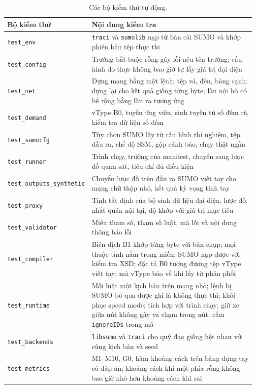 \documentclass[../DoAn.tex]{subfiles}
\begin{document}
\begin{table}[H]
\centering
\small
\caption{Các bộ kiểm thử tự động.}
\label{table:4.5}
\begin{tabular}{|p{3.6cm}|p{9.4cm}|}
\hline
\textbf{Bộ kiểm thử} & \textbf{Nội dung kiểm tra} \\ \hline
\texttt{test\_env} & \texttt{traci} và \texttt{sumolib} nạp từ bản cài SUMO và khớp phiên bản tệp thực thi \\ \hline
\texttt{test\_config} & Trường bắt buộc rỗng gây lỗi nêu tên trường; cấu hình đo thực không bao giờ tự lấy giá trị đại diện \\ \hline
\texttt{test\_net} & Dựng mạng bằng một lệnh; tệp vá, đèn, bảng cạnh; dựng lại cho kết quả giống từng byte; làn nội bộ có bề rộng bằng làn ra tương ứng \\ \hline
\texttt{test\_demand} & vType B0, tuyến ứng viên, sinh tuyến từ số đếm rẽ, kiểm tra dữ liệu số đếm \\ \hline
\texttt{test\_sumocfg} & Tùy chọn SUMO lấy từ cấu hình thí nghiệm, tệp đầu ra, chế độ SSM, gộp cảnh báo, chạy thật ngắn \\ \hline
\texttt{test\_runner} & Trình chạy, trường của manifest, chuyển sang lược đồ quan sát, tiêu chí đủ điều kiện \\ \hline
\texttt{test\_outputs\_\allowbreak synthetic} & Chuyển lược đồ trên đầu ra SUMO viết tay cho mạng chữ thập nhỏ, kết quả kỳ vọng tính tay \\ \hline
\texttt{test\_proxy} & Tính tất định của bộ sinh dữ liệu đại diện, lược đồ, nhất quán nội tại, độ khớp với giá trị mục tiêu \\ \hline
\texttt{test\_validator} & Miền tham số, tham số luật, mã lỗi và nội dung thông báo lỗi \\ \hline
\texttt{test\_compiler} & Biên dịch B1 khớp từng byte với bản chụp; mọi thuộc tính nằm trong miền; SUMO nạp được với kiểm tra XSD; đặc tả B0 tương đương tệp vType viết tay; mã vType báo về khi lấy từ phân phối \\ \hline
\texttt{test\_runtime} & Mỗi luật một kịch bản trên mạng nhỏ; lệnh bị SUMO bỏ qua được ghi là không thực thi; khôi phục speed mode; tích hợp với trình chạy; giữ xe giữa nút không gây va chạm trong nút; cấm \texttt{ignoreIDs} trong mã \\ \hline
\texttt{test\_backends} & \texttt{libsumo} và \texttt{traci} cho quỹ đạo giống hệt nhau với cùng kịch bản và seed \\ \hline
\texttt{test\_metrics} & M1--M10, G0, hàm khoảng cách trên bảng dựng tay có đáp án; khoảng cách khi một phía rỗng không bao giờ nhỏ hơn khoảng cách khi sai \\ \hline

\end{tabular}
\end{table}
\end{document}
